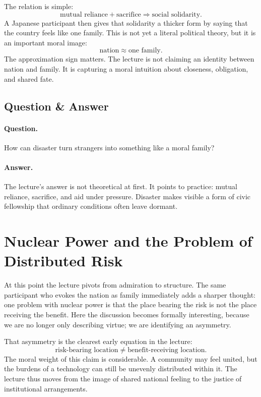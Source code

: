 The relation is simple:
\begin{equation}
\text{mutual reliance} + \text{sacrifice}
\Longrightarrow
\text{social solidarity}.
\end{equation}
A Japanese participant then gives that solidarity a thicker form by saying that the country feels like one family. This is not yet a literal political theory, but it is an important moral image:
\begin{equation}
\text{nation}
\approx
\text{one family}.
\end{equation}
The approximation sign matters. The lecture is not claiming an identity between nation and family. It is capturing a moral intuition about closeness, obligation, and shared fate.

\subsection{Question \& Answer}

\paragraph{Question.} How can disaster turn strangers into something like a moral family?

\paragraph{Answer.} The lecture's answer is not theoretical at first. It points to practice: mutual reliance, sacrifice, and aid under pressure. Disaster makes visible a form of civic fellowship that ordinary conditions often leave dormant.

\section{Nuclear Power and the Problem of Distributed Risk}

At this point the lecture pivots from admiration to structure. The same participant who evokes the nation as family immediately adds a sharper thought: one problem with nuclear power is that the place bearing the risk is not the place receiving the benefit. Here the discussion becomes formally interesting, because we are no longer only describing virtue; we are identifying an asymmetry.

That asymmetry is the clearest early equation in the lecture:
\begin{equation}
\text{risk-bearing location}
\neq
\text{benefit-receiving location}.
\end{equation}
The moral weight of this claim is considerable. A community may feel united, but the burdens of a technology can still be unevenly distributed within it. The lecture thus moves from the image of shared national feeling to the justice of institutional arrangements.

